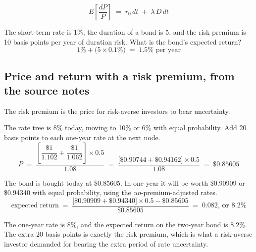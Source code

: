 \begin{mrfmlbox}
\[ E\!\left[\frac{dP}{P}\right] \;=\; r_0\,dt \;+\; \lambda\,D\,dt \]
\end{mrfmlbox}

\begin{mrexbox}[title={Example --- expected return with a duration-based premium}]
The short-term rate is 1\%, the duration of a bond is 5, and the risk premium is 10 basis points
per year of duration risk. What is the bond's expected return?
\tcblower
\small
\[ 1\% + \bigl(5 \times 0.1\%\bigr) \;=\; \mathbf{1.5\%} \text{ per year} \]
\end{mrexbox}

\subsection{Price and return with a risk premium, from the source notes}

\begin{mrdefbox}[title={Risk premium}]
The risk premium is the price for risk-averse investors to bear uncertainty.
\end{mrdefbox}

\begin{mrexbox}[title={Calculate the price of the 2-year zero with a 20 basis point risk premium}]
The rate tree is 8\% today, moving to 10\% or 6\% with equal probability. Add 20 basis points to
each one-year rate at the next node.
\tcblower
\small
\[ P \;=\; \frac{\left[ \dfrac{\$1}{1.102} + \dfrac{\$1}{1.062} \right] \times 0.5}{1.08}
   \;=\; \frac{\bigl[\$0.90744 + \$0.94162\bigr] \times 0.5}{1.08}
   \;=\; \mathbf{\$0.85605} \]
\end{mrexbox}

\begin{mrexbox}[title={Calculate the return on the 2-year zero with a 20 basis point risk premium}]
\small
The bond is bought today at \$0.85605. In one year it will be worth \$0.90909 or \$0.94340 with
equal probability, using the \textit{un}-premium-adjusted rates.
\[ \text{expected return} \;=\;
   \frac{\bigl[\$0.90909 + \$0.94340\bigr] \times 0.5 - \$0.85605}{\$0.85605}
   \;=\; \mathbf{0.082 \text{, or } 8.2\%} \]
\end{mrexbox}

\begin{mrkeybox}[title={Read the result}]
The one-year rate is 8\%, and the expected return on the two-year bond is 8.2\%. The extra 20
basis points is exactly the risk premium, which is what a risk-averse investor demanded for
bearing the extra period of rate uncertainty.
\end{mrkeybox}

